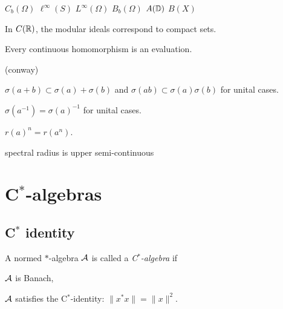 \documentclass{../note}
\begin{document}
$C_b(\Omega)$ $\ell^\infty(S)$ $L^\infty(\Omega)$ $B_b(\Omega)$ $A(\mathbb{D})$
$B(X)$

\begin{prb}
In $C(\mathbb{R})$, the modular ideals correspond to compact sets.
\end{prb}

\begin{prb}
\begin{parts}
\item Every continuous homomorphism is an evaluation.
\end{parts}
\end{prb}

\begin{prb}
(conway)
\end{prb}

\begin{prb}
\begin{parts}
\item $\sigma(a+b)\subset\sigma(a)+\sigma(b)$ and $\sigma(ab)\subset\sigma(a)\sigma(b)$ for unital cases.
\item $\sigma(a^{-1})=\sigma(a)^{-1}$ for unital cases.
\item $r(a)^n=r(a^n)$.
\end{parts}
\end{prb}

spectral radius is upper semi-continuous











\chapter{C$^*$-algebras}

\section{C$^*$ identity}


\begin{prb}[C$^*$ identity]
A normed $*$-algebra $\mathcal{A}$ is called a \emph{C$^*$-algebra} if
\begin{parts}
\item $\mathcal{A}$ is Banach,
\item $\mathcal{A}$ satisfies the C$^*$-identity: $\|x^*x\|=\|x\|^2$.
\end{parts}
\end{prb}
\end{document}
